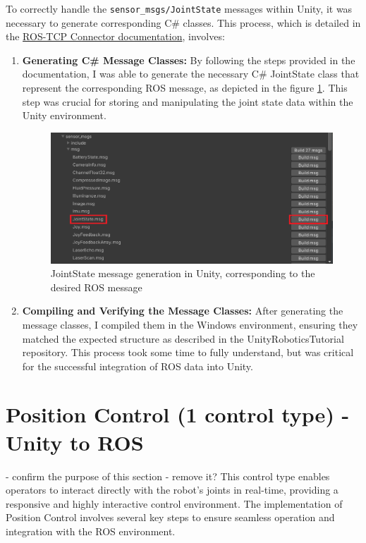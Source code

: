     To correctly handle the \texttt{sensor\_msgs/JointState} messages within Unity, it was necessary to generate corresponding C\# classes. This process, which is detailed in the \href{https://github.com/Unity-Technologies/ROS-TCP-Connector/blob/main/MessageGeneration.md}{ROS-TCP Connector documentation}, involves:
    \begin{enumerate}
        \item \textbf{Generating C\# Message Classes:} By following the steps provided in the documentation, I was able to generate the necessary C\# JointState class that represent the corresponding ROS message, as depicted in the figure \ref{fig:unityjoint_state_message}. This step was crucial for storing and manipulating the joint state data within the Unity environment.
        \begin{figure}
        \centering
        \includegraphics[width=0.75\linewidth]{figs/unityjoint_state_message.png}
        \caption{JointState message generation in Unity, corresponding to the desired ROS message}
        \label{fig:unityjoint_state_message}
        \end{figure}
        \item \textbf{Compiling and Verifying the Message Classes:} After generating the message classes, I compiled them in the Windows environment, ensuring they matched the expected structure as described in the UnityRoboticsTutorial repository. This process took some time to fully understand, but was critical for the successful integration of ROS data into Unity.
    \end{enumerate}



\section{Position Control (1 control type) - Unity to ROS} - confirm the purpose of this section - remove it?
    This control type enables operators to interact directly with the robot's joints in real-time, providing a responsive and highly interactive control environment. The implementation of Position Control involves several key steps to ensure seamless operation and integration with the ROS environment.
    
